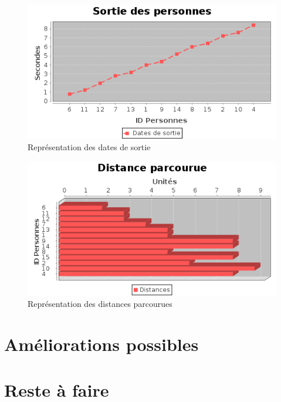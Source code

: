 \documentclass[twoside,UTF8]{EPURapport}
\begin{document}
	\begin{figure}[!H]
	\centering
	\includegraphics[scale=0.7]{imagesPNG/dateSortie.png}
	\caption{Représentation des dates de sortie\label{fig:date_sortie}}
	\end{figure}
	
	\begin{figure}[!H]
	\centering
	\includegraphics[scale=0.7]{imagesPNG/distanceParcourue.png}
	\caption{Représentation des distances parcourues\label{fig:distances_parcourues}}
	\end{figure}
	
	\section{Améliorations possibles}

	\section{Reste à faire}
	
\annexes
\end{document}
